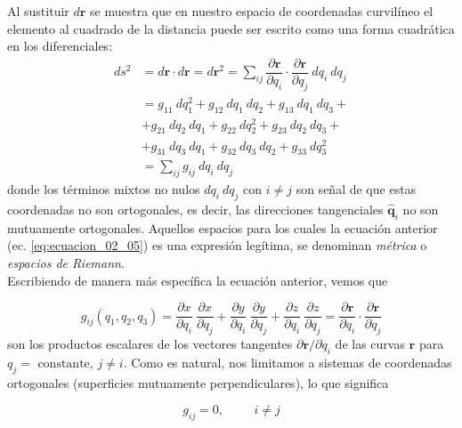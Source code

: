 Al sustituir $d\mathbf{r}$ se muestra que en nuestro espacio de coordenadas curvilíneo el elemento al cuadrado de la distancia puede ser escrito como una forma cuadrática en los diferenciales:
\begin{align}
ds^{2} &= d\mathbf{r} \cdot d \mathbf{r} =  d\mathbf{r}^{2} =  \sum_{ij} \dfrac{\partial \mathbf{r}}{\partial q_{i}} \cdot \dfrac{\partial \mathbf{r}}{\partial q_{j}} \: dq_{i} \: dq_{j} \nonumber \\
&= g_{11} \: dq_{1}^{2} + g_{12} \: dq_{1} \: dq_{2} + g_{13} \: dq_{1} \: dq_{3} + \nonumber \\
&+ g_{21} \: dq_{2} \: dq_{1} + g_{22} \: dq_{2}^{2} + g_{23} \: dq_{2} \: dq_{3} + \nonumber \\
&+ g_{31} \: dq_{3} \: dq_{1} + g_{32} \: dq_{3} \: dq_{2} + g_{33} \: dq_{3}^{2} \nonumber \\
&= \sum_{ij} g_{ij} \: dq_{i} \: dq_{j}
\label{eq:ecuacion_02_05}
\end{align}
donde los términos mixtos no nulos $dq_{i} \: dq_{j}$ con $i \neq j$ son señal de que estas coordenadas no son ortogonales, es decir, las direcciones tangenciales $\mathbf{\widehat{q}}_{i}$ no son mutuamente ortogonales. Aquellos espacios para los cuales la ecuación anterior (ec. \ref{eq:ecuacion_02_05}) es una expresión legítima, se denominan \emph{métrica} o \emph{espacios de Riemann}.
\\
Escribiendo de manera más específica la ecuación anterior, vemos que

\begin{equation}
g_{ij}(q_{1}, q_{2}, q_{3}) = \dfrac{\partial x}{\partial q_{i}} \: \dfrac{\partial x}{\partial q_{j}} + \dfrac{\partial y}{\partial q_{i}} \: \dfrac{\partial y}{\partial q_{j}} + \dfrac{\partial z}{\partial q_{i}} \: \dfrac{\partial z}{\partial q_{j}} = \dfrac{\partial \mathbf{r}}{\partial q_{i}} \cdot \dfrac{\partial \mathbf{r}}{\partial q_{j}}
\label{eq:ecuacion_02_06}
\end{equation}
son los productos escalares de los vectores tangentes $\partial \mathbf{r} / \partial q_{i}$ de las curvas $\mathbf{r}$ para $q_{j} = \mbox{ constante}$, $j \neq i$. Como es natural, nos limitamos a  sistemas de coordenadas ortogonales (superficies mutuamente perpendiculares), lo que significa

\begin{equation}
g_{ij} = 0, \hspace{1cm} i \neq j
\label{eq:ecuacion_02_07}
\end{equation}

